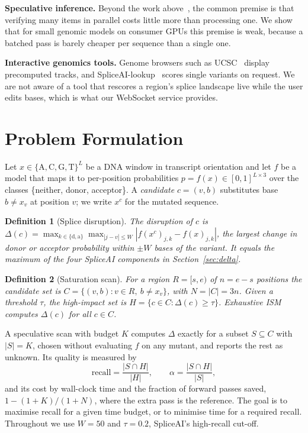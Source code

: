\documentclass[conference]{IEEEtran}
\newtheorem{definition}{Definition}
\begin{document}
\textbf{Speculative inference.} Beyond the work above~\cite{leviathan2023speculative,chen2023speculative,stern2018blockwise,cai2024medusa}, the common premise is that verifying many items in parallel costs little more than processing one. We show that for small genomic models on consumer GPUs this premise is weak, because a batched pass is barely cheaper per sequence than a single one.

\textbf{Interactive genomics tools.} Genome browsers such as UCSC~\cite{kent2002ucsc} display precomputed tracks, and SpliceAI-lookup~\cite{spliceailookup} scores single variants on request. We are not aware of a tool that rescores a region's splice landscape live while the user edits bases, which is what our WebSocket service provides.

\section{Problem Formulation}\label{sec:problem}
Let $x\in\{\mathrm{A,C,G,T}\}^L$ be a DNA window in transcript orientation and let $f$ be a model that maps it to per-position probabilities $p=f(x)\in[0,1]^{L\times 3}$ over the classes \{neither, donor, acceptor\}. A \emph{candidate} $c=(v,b)$ substitutes base $b\neq x_v$ at position $v$; we write $x^{c}$ for the mutated sequence.

\begin{definition}[Splice disruption]
The disruption of $c$ is $\Delta(c)=\max_{k\in\{\mathrm{d,a}\}}\max_{|j-v|\le W}|f(x^c)_{j,k}-f(x)_{j,k}|$, the largest change in donor or acceptor probability within $\pm W$ bases of the variant. It equals the maximum of the four SpliceAI components in Section~\ref{sec:delta}.
\end{definition}

\begin{definition}[Saturation scan]
For a region $R=[s,e)$ of $n=e-s$ positions the candidate set is $C=\{(v,b): v\in R,\ b\neq x_v\}$, with $N=|C|=3n$. Given a threshold $\tau$, the \emph{high-impact set} is $H=\{c\in C:\Delta(c)\ge\tau\}$. Exhaustive ISM computes $\Delta(c)$ for all $c\in C$.
\end{definition}

A speculative scan with budget $K$ computes $\Delta$ exactly for a subset $S\subseteq C$ with $|S|=K$, chosen without evaluating $f$ on any mutant, and reports the rest as unknown. Its quality is measured by
\begin{equation}
\mathrm{recall}=\frac{|S\cap H|}{|H|},\qquad \alpha=\frac{|S\cap H|}{|S|},
\end{equation}
and its cost by wall-clock time and the fraction of forward passes saved, $1-(1+K)/(1+N)$, where the extra pass is the reference. The goal is to maximise recall for a given time budget, or to minimise time for a required recall. Throughout we use $W=50$ and $\tau=0.2$, SpliceAI's high-recall cut-off.
\end{document}
